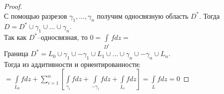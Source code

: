 \begin{proof}
    \ \\
    С помощью разрезов $\gamma_1, ..., \gamma_n$ получим односвязную область $D^*$. Тогда $D=D^*\cup\gamma_1\cup...\cup\gamma_n$.\\
    Так как $D^*$--односвязная, то $0=\int\limits_{D^*}fdz = $\\
    Граница $D^* = L_0\cup\gamma_1\cup-\gamma_1\cup L_1 \cup...\cup\gamma_n\cup-\gamma_n\cup L_n$.\\
    Тогда из аддитивности и ориентированности:\\
    $=\int\limits_{L_0}fdz+\sum_{i=1}^n\left[ \int\limits_{\gamma_i}fdz+\int\limits_{-\gamma_i}fdz+\int\limits_{L_i}fdz \right] = \int\limits_{L}fdz=0$
\end{proof}
